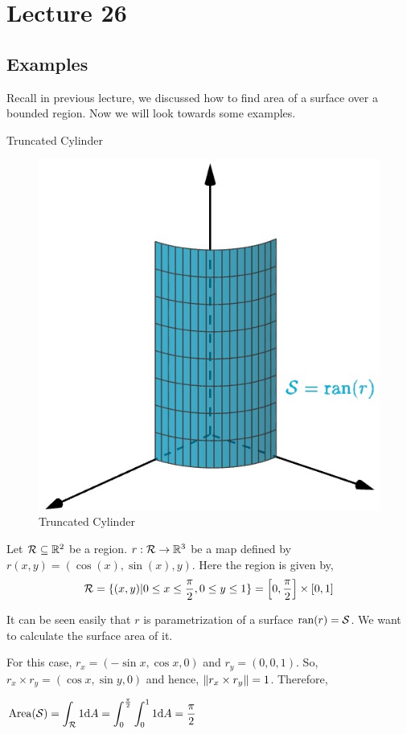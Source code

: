 \documentclass[../Analysis-3.tex]{subfiles}
\begin{document}
\chapter*{Lecture 26} %
\setcounter{chapter}{26} %
\setcounter{section}{0}

\section{Examples}
Recall in previous lecture, we discussed how to find area of a surface over a bounded region. Now we will look towards some examples.

\begin{Eg}{Truncated Cylinder}{}

  \begin{figure}
    \centering
    \includegraphics[width=.78\linewidth]{../figures/lec-26.1.png}
    \caption{Truncated Cylinder}
  \end{figure}

  Let $\mathcal{R} \subseteq \mathbb{R}^2$ be a region. $r : \mathcal{R} \to \mathbb{R}^3$ be a map defined by $r(x,y) = (\cos(x),\sin(x),y)$. Here the region is given by,
  \[\mathcal{R} = \{(x,y) | 0 \le x \le \frac{\pi}{2}, 0\le y \le 1\} = \qty[0,\frac{\pi}{2}] \times [0,1] \]

  It can be seen easily that $r$ is parametrization of a surface $\operatorname{ran}(r) = \mathcal{S}$. We want to calculate the surface area of it.

  For this case, $r_x = (-\sin x, \cos x, 0)$ and $r_y =(0,0,1)$. So, $ r_x \times r_y = (\cos x, \sin y, 0)$ and hence, $\norm{r_x \times r_y} = 1$. Therefore,

  $\displaystyle \operatorname{Area}(\mathcal{S}) = \int_{\mathcal{R}} 1 \dd A = \int_0^{\frac{\pi}{2}} \int_{0}^1 1 \dd A = \frac{\pi}{2}$

\end{Eg}
\end{document}
